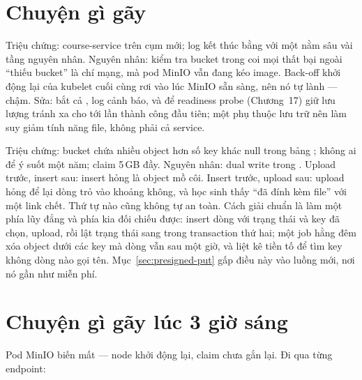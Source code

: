 \section{Chuyện gì gãy}

\begin{pitfall}
Triệu chứng: course-service  trên cụm mới; log
kết thúc bằng 
với một  nằm sâu vài tầng nguyên nhân. Nguyên
nhân: kiểm tra bucket trong  coi mọi thất bại
ngoài ``thiếu bucket'' là chí mạng, mà pod MinIO vẫn đang kéo image.
Back-off khởi động lại của kubelet cuối cùng rơi vào lúc MinIO sẵn sàng,
nên nó tự lành --- chậm. Sửa: bắt cả , log
cảnh báo, và để readiness probe (Chương~17) giữ lưu lượng tránh xa cho
tới lần  thành công đầu tiên; một phụ thuộc lưu trữ
nên làm suy giảm tính năng file, không phải cả service.
\end{pitfall}

\begin{pitfall}
Triệu chứng: bucket chứa nhiều object hơn số key khác null trong bảng
; không ai để ý suốt một năm; claim 5\,GB đầy. Nguyên
nhân: dual write trong . Upload trước, insert sau: insert
hỏng là object mồ côi. Insert trước, upload sau: upload hỏng để lại
dòng trỏ vào khoảng không, và học sinh thấy ``đã đính kèm file'' với
một link chết. Thứ tự nào cũng không tự an toàn. Cách giải chuẩn là làm
một phía lũy đẳng và phía kia đối chiếu được: insert dòng với trạng
thái  và key đã chọn, upload, rồi lật trạng thái
sang  trong transaction thứ hai; một job hằng đêm xóa
object dưới các key mà dòng vẫn  sau một giờ, và
liệt kê tiền tố để tìm key không dòng nào gọi tên.
Mục~\ref{sec:presigned-put} gấp điều này vào luồng mới, nơi nó gần như
miễn phí.
\end{pitfall}

\section{Chuyện gì gãy lúc 3 giờ sáng}

Pod MinIO biến mất --- node khởi động lại, claim chưa gắn lại. Đi qua
từng endpoint:

